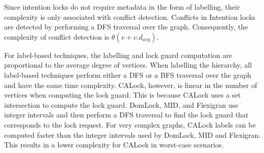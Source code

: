 Since intention locks do not require metadata in the form of labelling, their complexity is only associated with conflict detection. Conflicts in Intention locks are detected by performing a DFS traversal over the graph. Consequently, the complexity of conflict detection is $\theta(v+ {v}.{d_{avg}})$.

For label-based techniques, the labelling and lock guard computation are proportional to the average degree of vertices. When labelling the hierarchy, all label-based techniques perform either a DFS or a BFS traversal over the graph and have the same time complexity.
CALock, however, is linear in the number of vertices when computing the lock guard. This is because CALock uses a set intersection to compute the lock guard. DomLock, MID, and Flexigran use integer intervals and then perform a DFS traversal to find the lock guard that corresponds to the lock request.  For very complex graphs, CALock labels can be computed faster than the integer intervals used by DomLock, MID and Flexigran. This results in a lower complexity for CALock in worst-case scenarios.





	
